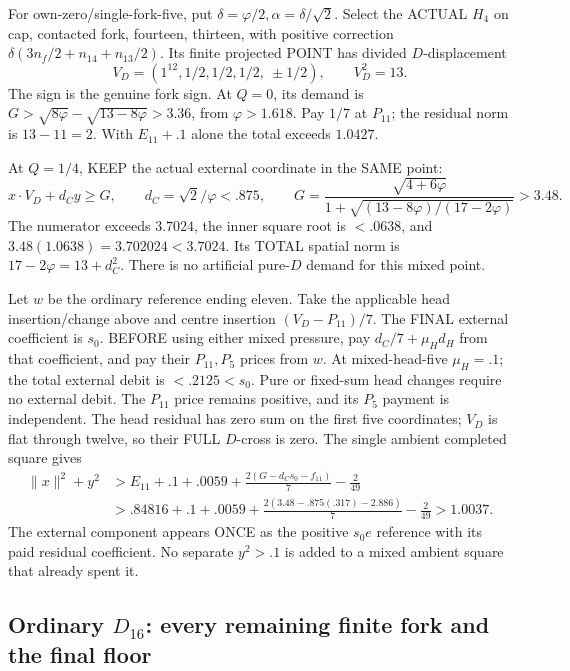 \documentclass[11pt]{article}
\begin{document}
For own-zero/single-fork-five, put
\(\delta=\varphi/2,\alpha=\delta/\sqrt2\).
Select the ACTUAL \(H_4\) on cap,
contacted fork, fourteen, thirteen, with
positive correction
\(\delta(3n_f/2+n_{14}+n_{13}/2)\).
Its finite projected POINT has divided
\(D\)-displacement
\[
                 V_D=(1^{12},1/2,1/2,1/2,\ \pm1/2),\qquad V_D^2=13 .
\]
The sign is the genuine fork sign.
At \(Q=0\), its demand is
\(G>\sqrt{8\varphi}-\sqrt{13-8\varphi}>3.36\),
from \(\varphi>1.618\).
Pay \(1/7\) at \(P_{11}\);
the residual norm is \(13-11=2\).
With \(E_{11}+.1\) alone the total
exceeds \(1.0427\).

At \(Q=1/4\), KEEP the actual external
coordinate in the SAME point:
\[
 x\cdot V_D+d_Cy\ge G,\qquad
 d_C=\sqrt2/\varphi<.875,\qquad
 G={\frac{\sqrt{4+6\varphi}}{1+\sqrt{(13-8\varphi)/(17-2\varphi)}}}>3.48 .
\]
The numerator exceeds \(3.7024\), the
inner square root is \(<.0638\), and
\(3.48(1.0638)=3.702024<3.7024\).
Its TOTAL spatial norm is
\(17-2\varphi=13+d_C^2\).
There is no artificial pure-\(D\)
demand for this mixed point.

Let \(w\) be the ordinary reference
ending eleven.
Take the applicable head insertion/change
above and centre insertion
\((V_D-P_{11})/7\).
The FINAL external coefficient is \(s_0\).
BEFORE using either mixed pressure, pay
\(d_C/7+\mu_Hd_H\) from that coefficient,
and pay their \(P_{11},P_5\) prices
from \(w\).
At mixed-head-five \(\mu_H=.1\);
the total external debit is \(<.2125<s_0\).
Pure or fixed-sum head changes require
no external debit.
The \(P_{11}\) price remains positive,
and its \(P_5\) payment is independent.
The head residual has zero sum on
the first five coordinates; \(V_D\)
is flat through twelve, so their FULL
\(D\)-cross is zero.
The single ambient completed square gives
\[
 \begin{split}
 \|x\|^2+y^2
 &>E_{11}+.1+.0059+
           {\frac{2(G-d_Cs_0-f_{11})}{7}}-{\frac{2}{49}}\\
 &>.84816+.1+.0059+
           {\frac{2(3.48-.875(.317)-2.886)}{7}}-{\frac{2}{49}}>1.0037 .
 \end{split}
\]
The external component appears ONCE as
the positive \(s_0e\) reference with its
paid residual coefficient.
No separate \(y^2>.1\) is added to a
mixed ambient square that already spent it.

\subsection[Ordinary D16: every remaining finite fork and the final floor]{Ordinary \(D_{16}\): every remaining finite fork and the final floor}
\label{app:arithD16ordinaryfinish}
\end{document}
